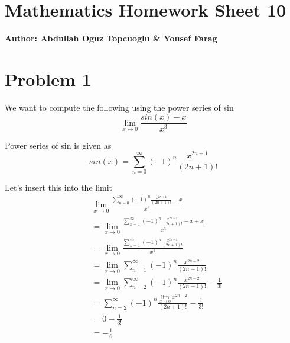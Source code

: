 \documentclass{article}
\begin{document}
\section*{\huge Mathematics Homework Sheet 10}
\begin{flushright}
   \textbf{Author: Abdullah Oguz Topcuoglu \& Yousef Farag}
\end{flushright}

\section*{Problem 1}

We want to compute the following using the power series of sin
\[
   \lim_{x \rightarrow 0} \frac{sin(x) - x}{x^3}
\]

Power series of sin is given as
\[
   sin(x) = \sum_{n=0}^{\infty} (-1)^n \frac{x^{2n+1}}{(2n+1)!}
\]

Let's insert this into the limit
\begin{align*}
   &\lim_{x \rightarrow 0} \frac{\sum_{n=0}^{\infty} (-1)^n \frac{x^{2n+1}}{(2n+1)!} - x}{x^3} \\
   &= \lim_{x \rightarrow 0} \frac{\sum_{n=1}^{\infty} (-1)^n \frac{x^{2n+1}}{(2n+1)!} - x + x}{x^3} \\
   &= \lim_{x \rightarrow 0} \frac{\sum_{n=1}^{\infty} (-1)^n \frac{x^{2n+1}}{(2n+1)!}}{x^3} \\
   &= \lim_{x \rightarrow 0} \sum_{n=1}^{\infty} (-1)^n \frac{x^{2n-2}}{(2n+1)!} \\
   &= \lim_{x \rightarrow 0} \sum_{n=2}^{\infty} (-1)^n \frac{x^{2n-2}}{(2n+1)!} - \frac{1}{3!} \\
   &= \sum_{n=2}^{\infty} (-1)^n \frac{\lim_{x \rightarrow 0} x^{2n-2}}{(2n+1)!} - \frac{1}{3!} \\
   &= 0 - \frac{1}{3!} \\
   &= - \frac{1}{6} \\
\end{align*}
\end{document}
